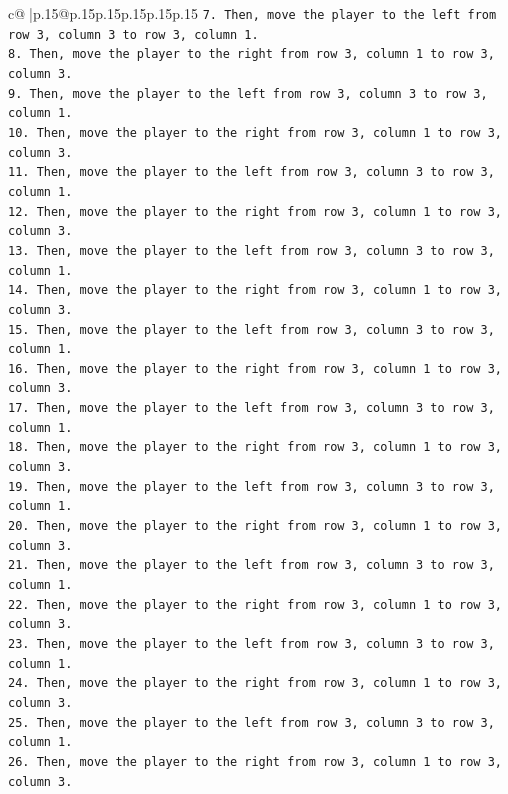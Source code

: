 \documentclass{article}
\begin{document}
{\begin{supertabular}{c@{$\;$}|p{.15\linewidth}@{}p{.15\linewidth}p{.15\linewidth}p{.15\linewidth}p{.15\linewidth}p{.15\linewidth}}
{{{\texttt{7. Then, move the player to the left from row 3, column 3 to row 3, column 1.} \\
\texttt{8. Then, move the player to the right from row 3, column 1 to row 3, column 3.} \\
\texttt{9. Then, move the player to the left from row 3, column 3 to row 3, column 1.} \\
\texttt{10. Then, move the player to the right from row 3, column 1 to row 3, column 3.} \\
\texttt{11. Then, move the player to the left from row 3, column 3 to row 3, column 1.} \\
\texttt{12. Then, move the player to the right from row 3, column 1 to row 3, column 3.} \\
\texttt{13. Then, move the player to the left from row 3, column 3 to row 3, column 1.} \\
\texttt{14. Then, move the player to the right from row 3, column 1 to row 3, column 3.} \\
\texttt{15. Then, move the player to the left from row 3, column 3 to row 3, column 1.} \\
\texttt{16. Then, move the player to the right from row 3, column 1 to row 3, column 3.} \\
\texttt{17. Then, move the player to the left from row 3, column 3 to row 3, column 1.} \\
\texttt{18. Then, move the player to the right from row 3, column 1 to row 3, column 3.} \\
\texttt{19. Then, move the player to the left from row 3, column 3 to row 3, column 1.} \\
\texttt{20. Then, move the player to the right from row 3, column 1 to row 3, column 3.} \\
\texttt{21. Then, move the player to the left from row 3, column 3 to row 3, column 1.} \\
\texttt{22. Then, move the player to the right from row 3, column 1 to row 3, column 3.} \\
\texttt{23. Then, move the player to the left from row 3, column 3 to row 3, column 1.} \\
\texttt{24. Then, move the player to the right from row 3, column 1 to row 3, column 3.} \\
\texttt{25. Then, move the player to the left from row 3, column 3 to row 3, column 1.} \\
\texttt{26. Then, move the player to the right from row 3, column 1 to row 3, column 3.} \\
}}}
\end{supertabular}}
\end{document}
